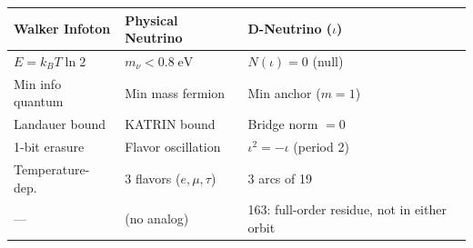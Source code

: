 \begin{center}
\begin{tabular}{@{}lll@{}}
\toprule
\textbf{Walker Infoton} & \textbf{Physical Neutrino} & \textbf{D-Neutrino ($\iota$)} \\
\midrule
$E = k_B T \ln 2$ & $m_\nu < 0.8\;\mathrm{eV}$ & $N(\iota) = 0$ (null) \\
Min info quantum & Min mass fermion & Min anchor ($m = 1$) \\
Landauer bound & KATRIN bound & Bridge norm $= 0$ \\
1-bit erasure & Flavor oscillation & $\iota^2 = -\iota$ (period 2) \\
Temperature-dep. & 3 flavors ($e, \mu, \tau$) & 3 arcs of 19 \\
--- & (no analog) & 163: full-order residue, not in either orbit \\
\bottomrule
\end{tabular}
\end{center}




